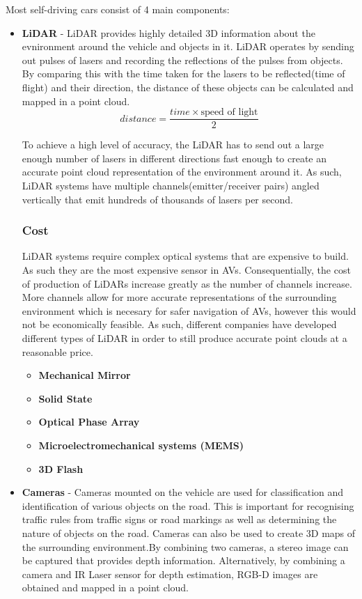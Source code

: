 Most self-driving cars consist of 4 main components: 
\begin{itemize}
    \item \textbf{LiDAR} - LiDAR provides highly detailed 3D information about the evnironment around the vehicle and objects in it. LiDAR operates by sending out pulses of lasers and recording the reflections of the pulses from objects. By comparing this with the time taken for the lasers to be reflected(time of flight) and their direction, the distance of these objects can be calculated and mapped in a point cloud. 
    \begin{equation*}
        distance = \frac{time \times \text{speed of light}}{2}
    \end{equation*}
    
    To achieve a high level of accuracy, the LiDAR has to send out a large enough number of lasers in different directions fast enough to create an accurate point cloud representation of the environment around it. As such, LiDAR systems have multiple channels(emitter/receiver pairs) angled vertically that  emit hundreds of thousands of lasers per second.
    
    \subsubsection{Cost}
    LiDAR systems require complex optical systems that are expensive to build. As such they are the most expensive sensor in AVs. Consequentially, the cost of production of LiDARs increase greatly as the number of channels increase. More channels allow for more accurate representations of the surrounding environment which is necesary for safer navigation of AVs, however this would not be economically feasible. 
    As such, different companies have developed different types of LiDAR in order to still produce accurate point clouds at a reasonable price. 

    \begin{itemize}
        \item \textbf{Mechanical Mirror}
        \item \textbf{Solid State}
        \item \textbf{Optical Phase Array}
        \item \textbf{Microelectromechanical systems (MEMS)}
        \item \textbf{3D Flash}
    \end{itemize}
    
   
    \item \textbf{Cameras} - Cameras mounted on the vehicle are used for classification and identification of various objects on the road. This is important for recognising traffic rules from traffic signs or road markings as well as determining the nature of objects on the road. 
    Cameras can also be used to create 3D maps of the surrounding environment.By combining two cameras, a stereo image can be captured that provides depth information. Alternatively, by combining a camera and IR Laser sensor for depth estimation, RGB-D images are obtained and mapped in a point cloud.


\end{itemize}

